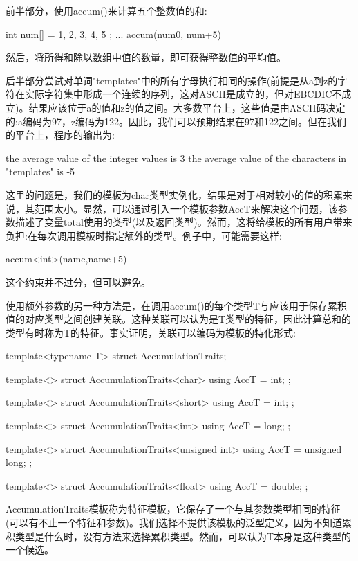 前半部分，使用accum()来计算五个整数值的和:

\begin{cpp}
int num[] = { 1, 2, 3, 4, 5 };
...
accum(num0, num+5)
\end{cpp}

然后，将所得和除以数组中值的数量，即可获得整数值的平均值。

后半部分尝试对单词"templates"中的所有字母执行相同的操作(前提是从a到z的字符在实际字符集中形成一个连续的序列，这对ASCII是成立的，但对EBCDIC不成立)。结果应该位于a的值和z的值之间。大多数平台上，这些值是由ASCII码决定的:a编码为97，z编码为122。因此，我们可以预期结果在97和122之间。但在我们的平台上，程序的输出为:

\begin{shell}
the average value of the integer values is 3
the average value of the characters in "templates" is -5
\end{shell}

这里的问题是，我们的模板为char类型实例化，结果是对于相对较小的值的积累来说，其范围太小。显然，可以通过引入一个模板参数AccT来解决这个问题，该参数描述了变量total使用的类型(以及返回类型)。然而，这将给模板的所有用户带来负担:在每次调用模板时指定额外的类型。例子中，可能需要这样:

\begin{cpp}
accum<int>(name,name+5)
\end{cpp}

这个约束并不过分，但可以避免。

使用额外参数的另一种方法是，在调用accum()的每个类型T与应该用于保存累积值的对应类型之间创建关联。这种关联可以认为是T类型的特征，因此计算总和的类型有时称为T的特征。事实证明，关联可以编码为模板的特化形式:

\begin{cpp}
template<typename T>
struct AccumulationTraits;

template<>
struct AccumulationTraits<char> {
	using AccT = int;
};

template<>
struct AccumulationTraits<short> {
	using AccT = int;
};

template<>
struct AccumulationTraits<int> {
	using AccT = long;
};

template<>
struct AccumulationTraits<unsigned int> {
	using AccT = unsigned long;
};

template<>
struct AccumulationTraits<float> {
	using AccT = double;
};
\end{cpp}

AccumulationTraits模板称为特征模板，它保存了一个与其参数类型相同的特征(可以有不止一个特征和参数)。我们选择不提供该模板的泛型定义，因为不知道累积类型是什么时，没有方法来选择累积类型。然而，可以认为T本身是这种类型的一个候选。

